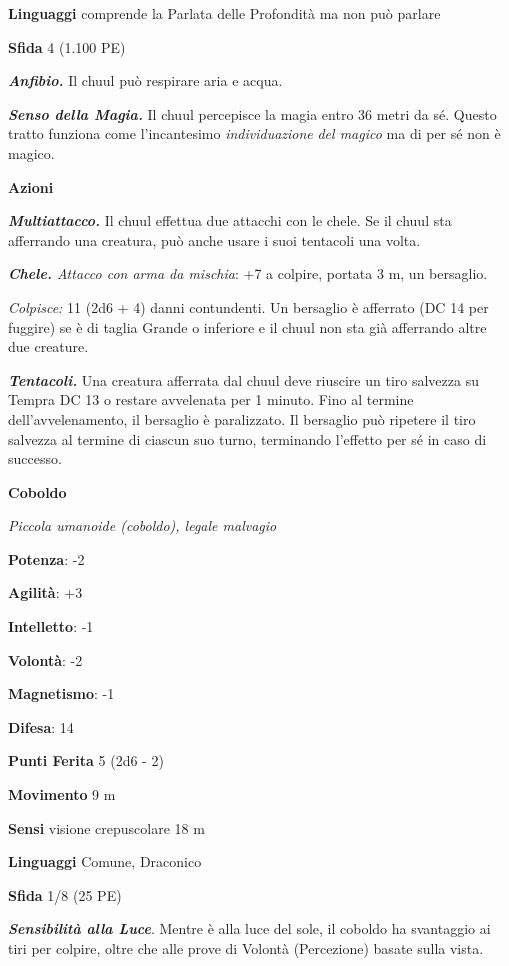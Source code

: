 \begin{multicols}{2}
\textbf{Linguaggi} comprende la Parlata delle Profondità ma non può
parlare

\textbf{Sfida} 4 (1.100 PE)

\emph{\textbf{Anfibio.}} Il chuul può respirare aria e acqua.

\emph{\textbf{Senso della Magia.}} Il chuul percepisce la magia entro 36
metri da sé. Questo tratto funziona come l'incantesimo
\emph{individuazione} \emph{del magico} ma di per sé non è magico.

\textbf{Azioni}

\emph{\textbf{Multiattacco.}} Il chuul effettua due attacchi con le
chele. Se il chuul sta afferrando una creatura, può anche usare i suoi
tentacoli una volta.

\emph{\textbf{Chele.} Attacco con arma da mischia}: +7 a colpire,
portata 3 m, un bersaglio.

\emph{Colpisce:} 11 (2d6 + 4) danni contundenti. Un bersaglio è
afferrato (DC 14 per fuggire) se è di taglia Grande o inferiore e il
chuul non sta già afferrando altre due creature.

\emph{\textbf{Tentacoli.}} Una creatura afferrata dal chuul deve
riuscire un tiro salvezza su Tempra DC 13 o restare avvelenata per
1 minuto. Fino al termine dell'avvelenamento, il bersaglio è
paralizzato. Il bersaglio può ripetere il tiro salvezza al termine di
ciascun suo turno, terminando l'effetto per sé in caso di successo.

\textbf{Coboldo}

\emph{Piccola umanoide (coboldo), legale malvagio}

\textbf{Potenza}: -2

\textbf{Agilità}: +3

\textbf{Intelletto}: -1

\textbf{Volontà}: -2

\textbf{Magnetismo}: -1

\textbf{Difesa}: 14

\textbf{Punti Ferita} 5 (2d6 - 2)

\textbf{Movimento} 9 m

\textbf{Sensi} visione crepuscolare 18 m

\textbf{Linguaggi} Comune, Draconico

\textbf{Sfida} 1/8 (25 PE)

\emph{\textbf{Sensibilità alla Luce}}. Mentre è alla luce del sole, il
coboldo ha svantaggio ai tiri per colpire, oltre che alle prove di
Volontà (Percezione) basate sulla vista.


\end{multicols}
